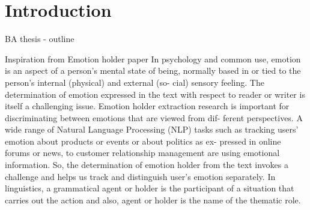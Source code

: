 
\chapter{Introduction} %

\label{ch:introduction} %


BA thesis - outline

Inspiration from Emotion holder paper
In psychology and common use, emotion is an aspect of a person's mental state of
being, normally based in or tied to the person's internal (physical) and external (so-
cial) sensory feeling. The determination of emotion expressed in the text with
respect to reader or writer is itself a challenging issue. Emotion holder extraction
research is important for discriminating between emotions that are viewed from dif-
ferent perspectives. A wide range of Natural Language Processing (NLP) tasks
such as tracking users' emotion about products or events or about politics as ex-
pressed in online forums or news, to customer relationship management are using
emotional information. So, the determination of emotion holder from the text invokes
a challenge and helps us track and distinguish user's emotion separately.
In linguistics, a grammatical agent or holder is the participant of a situation that carries out the action and also, agent or holder is the name of the thematic role.



